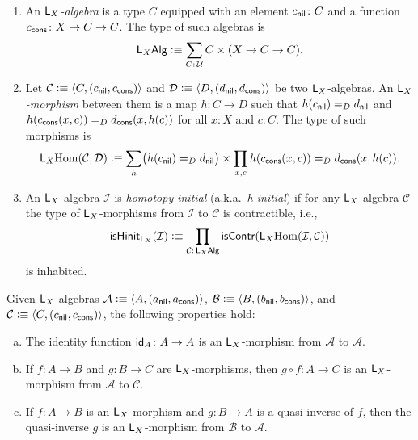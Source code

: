 \begin{defns}\ 
    \begin{enumerate}[-]
            \item An \textsl{$\mathsf{L}_X$-algebra} is a type $C$ equipped with an element $c_{\fun{nil}}\colon C$ and a function $c_{\fun{cons}}\colon X\to C\to C$. The type of such algebras is
            \[
                \fun L_X\fun{Alg}\defeq\sum_{C\colon\univ}C\times(X\to C\to C).
            \]
            \item Let $\mathcal C\mathrel{\vcentcolon}\equiv\langle C,(c_{\mathsf{nil}},c_{\mathsf{cons}})\rangle$ and $\mathcal D\mathrel{\vcentcolon}\equiv\langle D,(d_{\mathsf{nil}}, d_{\mathsf{cons}})\rangle$ be two $\mathsf{L}_X$-algebras. An \textsl{$\mathsf{L}_X$-morphism} between them is a map $h\colon C\to D$ such that $h(c_{\mathsf{nil}})\mathrel{=_{D}}d_{\mathsf{nil}}$ and $h(c_{\mathsf{cons}}(x,c))\mathrel{=_{D}}d_{\mathsf{cons}}(x,h(c))$ for all $x\colon X$ and $c\colon C$. The type of such morphisms is
        \[
            \mathsf{L}_X{\operatorname{Hom}}(\mathcal C,\mathcal D)\mathrel{\vcentcolon}\equiv
            \sum_{h}
                \bigl(
                    h(c_{\mathsf{nil}})
                    \mathrel{=_{D}}
                    d_{\mathsf{nil}}
                \bigr)
                \times
                \prod_{x,c}
                    h(c_{\mathsf{cons}}(x,c))
                    \mathrel{=_{D}}
                    d_{\mathsf{cons}}(x, h(c)).
        \]
    
        \item An $\mathsf{L}_X$-algebra $\mathcal I$ is \textsl{homotopy-initial} (a.k.a.~\textsl{h-initial}) if for any $\mathsf{L}_X$-algebra $\mathcal C$ the type of $\mathsf{L}_X$-morphisms from $\mathcal I$ to $\mathcal C$ is contractible, i.e.,
        \[
            \fun{isHinit}_{\fun L_X}(\mathcal I)
                \defeq
                \prod_{\mathcal C\colon\fun L_X\fun{Alg}}
                    \fun{isContr}(
                        \fun L_X\Hom(\mathcal I,\mathcal C)
                    )
        \]
        is inhabited.
    \end{enumerate}
\end{defns}

\begin{lem}\label{lem:L_X-morphisms-are-morphisms}
    Given $\mathsf{L}_X$-algebras $\mathcal{A}\mathrel{\vcentcolon}\equiv\langle A,(a_{\mathsf{nil}}, a_{\mathsf{cons}})\rangle$, $\mathcal{B}\mathrel{\vcentcolon}\equiv\langle B,(b_{\mathsf{nil}},b_{\mathsf{cons}})\rangle$, and $\mathcal{C}\mathrel{\vcentcolon}\equiv\langle C,(c_{\mathsf{nil}}, c_{\mathsf{cons}})\rangle$, the following properties hold:
    \begin{enumerate}[a),font=\upshape]
        \item The identity function $\id_A\colon A\to A$ is an $\mathsf{L}_X$-morphism from $\mathcal{A}$ to $\mathcal{A}$.
        \item If $f\colon A\to B$ and $g\colon B\to C$ are $\mathsf{L}_X$-morphisms, then $g\circ f\colon A\to C$ is an $\mathsf{L}_X$-morphism from $\mathcal{A}$ to $\mathcal{C}$.
        \item If $f\colon A\to B$ is an $\mathsf{L}_X$-morphism and $g\colon B\to A$ is a quasi-inverse of $f$, then the quasi-inverse $g$ is an $\mathsf{L}_X$-morphism from $\mathcal{B}$ to $\mathcal{A}$.
    \end{enumerate}
\end{lem}

